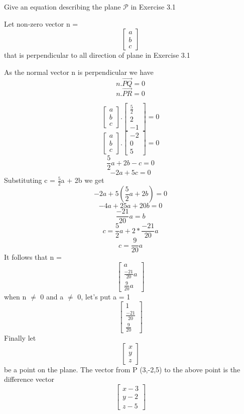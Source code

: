 Give an equation describing the plane $\mathcal{P}$ in Exercise 3.1

Let non-zero vector n = 
\[
\begin{bmatrix}
a \\ b \\ c
\end{bmatrix}
\]
that is perpendicular to all direction of plane in Exercise 3.1

As the normal vector n is perpendicular we have 
\[
n . \overrightarrow{PQ} = 0 
\]
\[
n . \overrightarrow{PR} = 0
\]

\[
\begin{bmatrix}
a \\ b \\ c 
\end{bmatrix} . 
\begin{bmatrix}
\frac{5}{2} \\ 2 \\ -1
\end{bmatrix}
 = 0
\]
\[
\begin{bmatrix}
a \\ b \\ c 
\end{bmatrix} . 
\begin{bmatrix}
-2 \\ 0 \\ 5
\end{bmatrix}
 = 0
\]
\[
\frac{5}{2} a + 2b - c = 0
\]
\[
-2a + 5c = 0
\]
Substituting c = $\frac{5}{2}$a + 2b
we get 
\[
-2a + 5(\frac{5}{2}a + 2b) =0
\]
\[
-4a + 25a + 20b= 0
\]
\[
\frac{-21}{20}a =  b
\]
\[
c = \frac{5}{2}a +2*\frac{-21}{20}a
\]
\[
c = \frac{9}{20}a
\]
It follows that n = 
\[
\begin{bmatrix}
a \\ \frac{-21}{20}a \\ \frac{9}{20}a
\end{bmatrix}
\]
when n $\neq$ 0  and  a $\neq$ 0, let's put a = 1
\[
\begin{bmatrix}
1 \\ \frac{-21}{20} \\ \frac{9}{20}
\end{bmatrix}
\]
Finally let 
\[
\begin{bmatrix}
x \\ y \\ z
\end{bmatrix}
\]
be a point on the plane. The vector from P (3,-2,5) to the above point is 
the difference vector 
\[
\begin{bmatrix}
    x - 3 \\ y -2 \\ z - 5
\end{bmatrix}
\]
